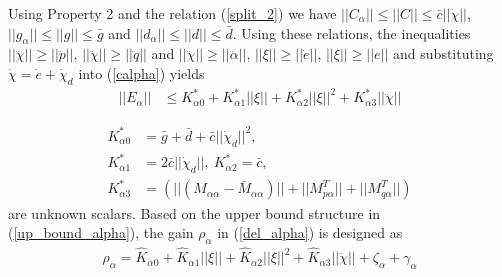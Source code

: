 \documentclass[letterpaper, 10 pt, conference]{ieeeconf}  %
\begin{document}
 
Using Property 2 and the relation (\ref{split_2}) we have $||C_{\alpha}|| \leq ||C|| \leq \bar{c}||\dot{\chi}||$, $||g_{\alpha}|| \leq ||g|| \leq \bar{g}$ and $||d_{\alpha}|| \leq ||d|| \leq \bar{d}$. Using these relations, the inequalities $||\ddot{\chi}|| \geq ||\ddot{p}||$, $||\ddot{\chi}|| \geq ||\ddot{q}||$ and $||\ddot{\chi}|| \geq ||\ddot{\alpha}||$, $||\xi|| \geq ||\dot{e}||$, $||\xi|| \geq ||{e}||$ and substituting $\dot{\chi} = \dot{e} + \dot{\chi}_d$ into (\ref{calpha}) yields
\begin{align} 
||E_{\alpha}|| &\leq K_{\alpha0}^*  +K_{\alpha1}^*||\xi||+ K_{\alpha2}^*||\xi||^2 + K_{\alpha3}^*||\ddot{\chi}||\label{up_bound_alpha} 
\end{align}

\begin{align*}
 K_{\alpha0}^* &= \bar{g} + \bar{d} + \bar{c}||\dot{\chi}_d||^2,\\
K_{\alpha1}^* &= 2\bar{c}|| \dot{\chi}_d||,~
K_{\alpha2}^* = \bar{c}, \\
K_{\alpha3}^* &=  (||(M_{\alpha\alpha} - \bar{M}_{\alpha\alpha} )||+ ||M^T_{p\alpha}|| + ||M^T_{q\alpha}||)
\end{align*}
are unknown scalars. Based on the upper bound structure in (\ref{up_bound_alpha}), the gain $\rho_{\alpha}$ in (\ref{del_alpha}) is designed as
\begin{align}
\rho_{\alpha} = \hat{K}_{\alpha0} + \hat{K}_{\alpha1}||\xi|| + \hat{K}_{\alpha2}||\xi||^2 + \hat{K}_{\alpha3}||\ddot{\chi}|| + \zeta_{\alpha} + \gamma_{\alpha} \label{rho_alpha} 
\end{align}
\end{document}

